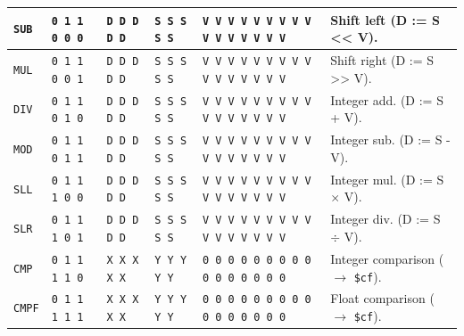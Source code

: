 \documentclass[a5paper]{report}
\begin{document}
{\begin{center}
\begin{tabular}[ht]{
	| p{} | p{} | p{} | p{}
	| p{} | p{} |
}
	\texttt{SUB} & \texttt{0 1 1 0 0 0} & \texttt{D D D D D} & \texttt{S S S S S} &
		\texttt{V V V V V V V V V V V V V V V V} & Shift left (D := S << V). \\
	\hline
	
	\texttt{MUL} & \texttt{0 1 1 0 0 1} & \texttt{D D D D D} & \texttt{S S S S S} &
		\texttt{V V V V V V V V V V V V V V V V} & Shift right (D := S >> V). \\
	\hline
	
	\texttt{DIV} & \texttt{0 1 1 0 1 0} & \texttt{D D D D D} & \texttt{S S S S S} &
		\texttt{V V V V V V V V V V V V V V V V} & Integer add. (D := S + V). \\
	\hline
	
	\texttt{MOD} & \texttt{0 1 1 0 1 1} & \texttt{D D D D D} & \texttt{S S S S S} &
		\texttt{V V V V V V V V V V V V V V V V} & Integer sub. (D := S - V). \\
	\hline
	
	\texttt{SLL} & \texttt{0 1 1 1 0 0} & \texttt{D D D D D} & \texttt{S S S S S} &
		\texttt{V V V V V V V V V V V V V V V V} & Integer mul. (D := S $\times$ V). \\
	\hline
	
	\texttt{SLR} & \texttt{0 1 1 1 0 1} & \texttt{D D D D D} & \texttt{S S S S S} &
		\texttt{V V V V V V V V V V V V V V V V} & Integer div. (D := S $\div$ V). \\
	\hline
	
	\texttt{CMP} & \texttt{0 1 1 1 1 0} & \texttt{X X X X X} & \texttt{Y Y Y Y Y} &
		\texttt{0 0 0 0 0 0 0 0 0 0 0 0 0 0 0 0} & Integer comparison ($\rightarrow$ \texttt{\$cf}). \\
	\hline
	
	\texttt{CMPF} & \texttt{0 1 1 1 1 1} & \texttt{X X X X X} & \texttt{Y Y Y Y Y} &
		\texttt{0 0 0 0 0 0 0 0 0 0 0 0 0 0 0 0} & Float comparison ($\rightarrow$ \texttt{\$cf}). \\
	\hline
\end{tabular}
\end{center}
}
\end{document}
